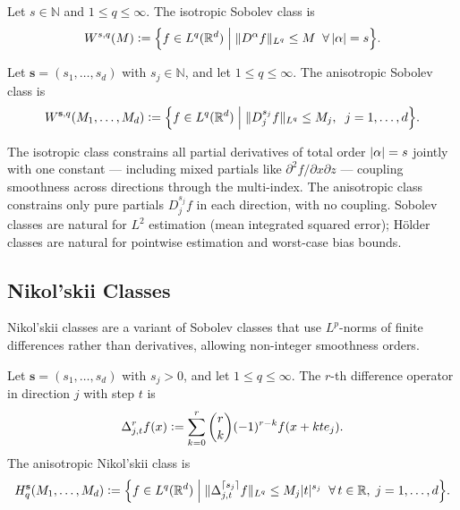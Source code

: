 \begin{definition}\label{def:sobolev_iso}
	Let $s \in \mathbb{N}$ and $1 \leq q \leq \infty$.
	The isotropic Sobolev class is
	\begin{equation*}
		W^{s,q}(M) \vcentcolon= \Bigl\{ f \in L^q(\mathbb{R}^d) \;\Big|\; \lVert D^\alpha f\rVert_{L^q} \leq M \;\;\forall\, \lvert\alpha\rvert = s \Bigr\}.
	\end{equation*}
\end{definition}

\begin{definition}\label{def:sobolev_aniso}
	Let $\mathbf{s} = (s_1, \ldots, s_d)$ with $s_j \in \mathbb{N}$, and let $1 \leq q \leq \infty$.
	The anisotropic Sobolev class is
	\begin{equation*}
		W^{\mathbf{s}, q}(M_1, \ldots, M_d) \vcentcolon= \Bigl\{ f \in L^q(\mathbb{R}^d) \;\Big|\; \lVert D_j^{s_j} f\rVert_{L^q} \leq M_j,\;\; j = 1, \ldots, d \Bigr\}.
	\end{equation*}
\end{definition}

The isotropic class constrains all partial derivatives of total order $\lvert\alpha\rvert = s$ jointly with one constant --- including mixed partials like $\partial^2 f / \partial x \partial z$ --- coupling smoothness across directions through the multi-index.
The anisotropic class constrains only pure partials $D_j^{s_j} f$ in each direction, with no coupling.
Sobolev classes are natural for $L^2$ estimation (mean integrated squared error); Hölder classes are natural for pointwise estimation and worst-case bias bounds.


\subsection{Nikol'skii Classes}\label{sec:appendix:nikolskii}

Nikol'skii classes \parencite{nikolskii_approximation_1975} are a variant of Sobolev classes that use $L^p$-norms of finite differences rather than derivatives, allowing non-integer smoothness orders.

\begin{definition}\label{def:nikolskii}
	Let $\mathbf{s} = (s_1, \ldots, s_d)$ with $s_j > 0$, and let $1 \leq q \leq \infty$.
	The $r$-th difference operator in direction $j$ with step $t$ is
	\begin{equation*}
		\Delta_{j,t}^r f(x) \vcentcolon= \sum_{k=0}^{r} \binom{r}{k} (-1)^{r-k} f(x + k t e_j).
	\end{equation*}
	The anisotropic Nikol'skii class is
	\begin{equation*}
		H_q^{\mathbf{s}}(M_1, \ldots, M_d) \vcentcolon= \Bigl\{ f \in L^q(\mathbb{R}^d) \;\Big|\; \lVert\Delta_{j,t}^{\lceil s_j \rceil} f\rVert_{L^q} \leq M_j \lvert t\rvert^{s_j} \;\;\forall\, t \in \mathbb{R},\; j = 1, \ldots, d \Bigr\}.
	\end{equation*}
\end{definition}

